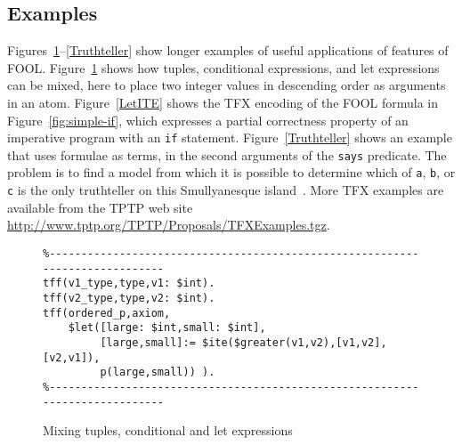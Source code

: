 \documentclass{easychair}
\begin{document}
\subsection{Examples}
\label{Examples}

Figures~\ref{TupleConditionalLet}--\ref{Truthteller} show longer examples of
useful applications of features of FOOL. 
Figure~\ref{TupleConditionalLet} shows how tuples, conditional expressions, 
and let expressions can be mixed, here to place two integer values in 
descending order as arguments in an atom. 
Figure~\ref{LetITE} shows the TFX encoding of the FOOL formula in 
Figure~\ref{fig:simple-if}, which expresses a partial correctness property 
of an imperative program with an \texttt{if} statement. 
Figure~\ref{Truthteller} shows an example that uses formulae as terms, in 
the second arguments of the {\tt says} predicate. 
The problem is to find a model from which it is possible to determine which 
of {\tt a}, {\tt b}, or {\tt c} is the only truthteller on this Smullyanesque 
island~\cite{Smu78}. 
More TFX examples are available from the TPTP web site 
\url{http://www.tptp.org/TPTP/Proposals/TFXExamples.tgz}.


\begin{figure}[htbp]
\begin{verbatim}
%-----------------------------------------------------------------------------
tff(v1_type,type,v1: $int).
tff(v2_type,type,v2: $int).
tff(ordered_p,axiom,
    $let([large: $int,small: $int],
         [large,small]:= $ite($greater(v1,v2),[v1,v2],[v2,v1]),
         p(large,small)) ).
%-----------------------------------------------------------------------------
\end{verbatim}
\caption{Mixing tuples, conditional and let expressions}
\label{TupleConditionalLet}
\end{figure}
\end{document}
